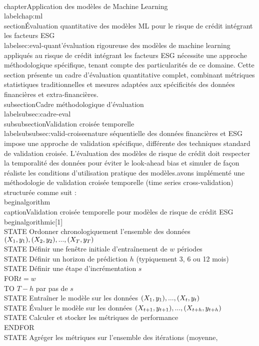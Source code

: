 \\chapter{Application des modèles de Machine Learning}\\label{chap:ml}\n\n\\section{Évaluation quantitative des modèles ML pour le risque de crédit intégrant les facteurs ESG}\\label{sec:eval-quant}\n\nL'évaluation rigoureuse des modèles de machine learning appliqués au risque de crédit intégrant les facteurs ESG nécessite une approche méthodologique spécifique, tenant compte des particularités de ce domaine. Cette section présente un cadre d'évaluation quantitative complet, combinant métriques statistiques traditionnelles et mesures adaptées aux spécificités des données financières et extra-financières.\n\n\\subsection{Cadre méthodologique d'évaluation}\\label{subsec:cadre-eval}\n\n\\subsubsection{Validation croisée temporelle}\\label{subsubsec:valid-croisee}\n\nLa nature séquentielle des données financières et ESG impose une approche de validation spécifique, différente des techniques standard de validation croisée. L'évaluation des modèles de risque de crédit doit respecter la temporalité des données pour éviter le look-ahead bias et simuler de façon réaliste les conditions d'utilisation pratique des modèles.\n\nNous avons implémenté une méthodologie de validation croisée temporelle (time series cross-validation) structurée comme suit :\n\n\\begin{algorithm}\n\\caption{Validation croisée temporelle pour modèles de risque de crédit ESG}\n\\begin{algorithmic}[1]\n\\STATE Ordonner chronologiquement l'ensemble des données $\\{(X_1, y_1), (X_2, y_2), ..., (X_T, y_T)\\}$\n\\STATE Définir une fenêtre initiale d'entraînement de $w$ périodes\n\\STATE Définir un horizon de prédiction $h$ (typiquement 3, 6 ou 12 mois)\n\\STATE Définir une étape d'incrémentation $s$\n\\FOR{$t = w$ \\TO $T-h$ par pas de $s$}\n    \\STATE Entraîner le modèle sur les données $\\{(X_1, y_1), ..., (X_t, y_t)\\}$\n    \\STATE Évaluer le modèle sur les données $\\{(X_{t+1}, y_{t+1}), ..., (X_{t+h}, y_{t+h})\\}$\n    \\STATE Calculer et stocker les métriques de performance\n\\ENDFOR\n\\STATE Agréger les métriques sur l'ensemble des itérations (moyenne, 